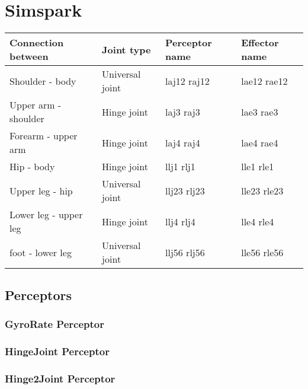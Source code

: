 \chapter{Simspark}

\begin{tabular}{|l|l|l|l|}
\hline
{\bf Connection between}  & {\bf Joint type} & {\bf Perceptor name}& {\bf
Effector name} \\
\hline
Shoulder - body  & Universal joint & laj12  raj12 & lae12   rae12 \\
\hline
Upper arm - shoulder  & Hinge joint & laj3  raj3 & lae3   rae3 \\
\hline
Forearm - upper arm  & Hinge joint & laj4  raj4 & lae4   rae4 \\
\hline
Hip - body  & Hinge joint & llj1  rlj1 & lle1   rle1 \\
\hline
Upper leg - hip & Universal joint & llj23  rlj23 & lle23   rle23 \\
\hline
Lower leg - upper leg & Hinge joint & llj4  rlj4 & lle4   rle4 \\
\hline
foot - lower leg & Universal joint & llj56  rlj56 & lle56   rle56 \\
\hline
\end{tabular}

\section{Perceptors}



\subsection{GyroRate Perceptor}

\subsection{HingeJoint Perceptor}

\subsection{Hinge2Joint Perceptor}

